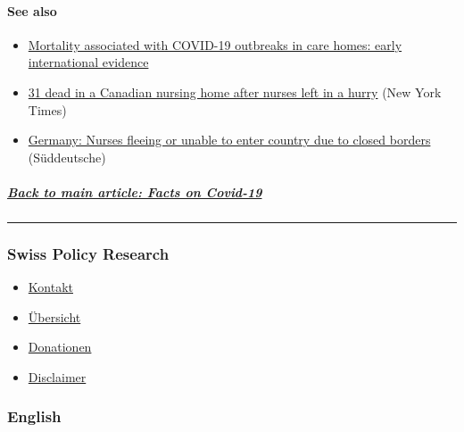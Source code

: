 \hypertarget{see-also}{%
\paragraph{See also}\label{see-also}}

\begin{itemize}
\tightlist
\item
  \href{https://ltccovid.org/2020/04/12/mortality-associated-with-covid-19-outbreaks-in-care-homes-early-international-evidence/}{Mortality
  associated with COVID-19 outbreaks in care homes: early international
  evidence}
\item
  \href{https://www.nytimes.com/2020/04/16/world/canada/montreal-nursing-homes-coronavirus.html}{31
  dead in a Canadian nursing home after nurses left in a hurry} (New
  York Times)
\item
  \href{https://www.sueddeutsche.de/politik/coronavirus-pflegekraefte-ausland-1.4866124}{Germany:
  Nurses fleeing or unable to enter country due to closed borders}
  (Süddeutsche)
\end{itemize}

\hypertarget{back-to-main-article-facts-on-covid-19}{%
\subparagraph{\texorpdfstring{\href{https://swprs.org/a-swiss-doctor-on-covid-19/}{Back
to main article: Facts on
Covid-19}}{Back to main article: Facts on Covid-19}}\label{back-to-main-article-facts-on-covid-19}}

\begin{center}\rule{0.5\linewidth}{\linethickness}\end{center}

\hypertarget{swiss-policy-research}{%
\subsubsection{Swiss Policy Research}\label{swiss-policy-research}}

\begin{itemize}
\tightlist
\item
  \href{https://swprs.org/kontakt/}{Kontakt}
\item
  \href{https://swprs.org/uebersicht/}{Übersicht}
\item
  \href{https://swprs.org/donationen/}{Donationen}
\item
  \href{https://swprs.org/disclaimer/}{Disclaimer}
\end{itemize}

\hypertarget{english}{%
\subsubsection{English}\label{english}}

